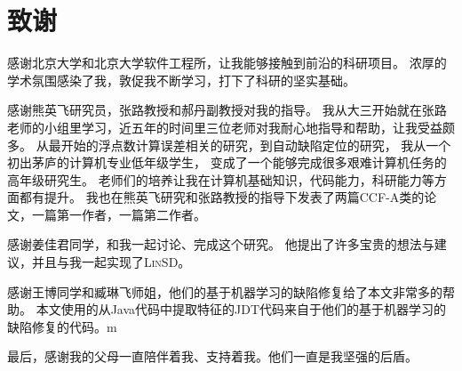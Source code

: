 \chapter{致谢}

感谢北京大学和北京大学软件工程所，让我能够接触到前沿的科研项目。
浓厚的学术氛围感染了我，敦促我不断学习，打下了科研的坚实基础。

感谢熊英飞研究员，张路教授和郝丹副教授对我的指导。
我从大三开始就在张路老师的小组里学习，近五年的时间里三位老师对我耐心地指导和帮助，让我受益颇多。
从最开始的浮点数计算误差相关的研究，到自动缺陷定位的研究，
我从一个初出茅庐的计算机专业低年级学生，
变成了一个能够完成很多艰难计算机任务的高年级研究生。
老师们的培养让我在计算机基础知识，代码能力，科研能力等方面都有提升。
我也在熊英飞研究和张路教授的指导下发表了两篇CCF-A类的论文，一篇第一作者，一篇第二作者。

感谢姜佳君同学，和我一起讨论、完成这个研究。
他提出了许多宝贵的想法与建议，并且与我一起实现了\textsc{LinSD}。

感谢王博同学和臧琳飞师姐，他们的基于机器学习的缺陷修复给了本文非常多的帮助。
本文使用的从Java代码中提取特征的JDT代码来自于他们的基于机器学习的缺陷修复的代码。m

最后，感谢我的父母一直陪伴着我、支持着我。他们一直是我坚强的后盾。